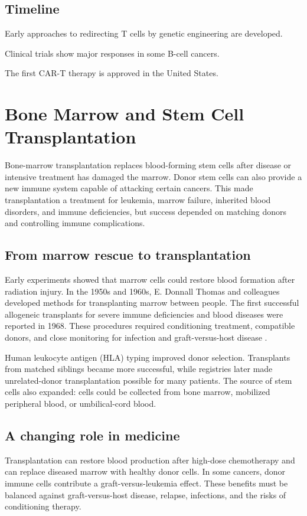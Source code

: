 \documentclass[12pt,oneside]{book}
\begin{document}
\section*{Timeline}
\begin{description}[leftmargin=2.3cm,style=nextline]
  \item[1980s--1990s] Early approaches to redirecting T cells by genetic engineering are developed.
  \item[2010s] Clinical trials show major responses in some B-cell cancers.
  \item[2017] The first CAR-T therapy is approved in the United States.
\end{description}
\chapter[Bone Marrow and Stem Cell Transplantation]{Bone Marrow and Stem Cell Transplantation}

Bone-marrow transplantation replaces blood-forming stem cells after disease or
intensive treatment has damaged the marrow. Donor stem cells can also provide
a new immune system capable of attacking certain cancers. This made
transplantation a treatment for leukemia, marrow failure, inherited blood
disorders, and immune deficiencies, but success depended on matching donors
and controlling immune complications.

\section{From marrow rescue to transplantation}
Early experiments showed that marrow cells could restore blood formation after radiation injury. In the 1950s and 1960s, E. Donnall Thomas and colleagues developed methods for transplanting marrow between people. The first successful allogeneic transplants for severe immune deficiencies and blood diseases were reported in 1968. These procedures required conditioning treatment, compatible donors, and close monitoring for infection and graft-versus-host disease \cite{transplantHistory}.

Human leukocyte antigen (HLA) typing improved donor selection. Transplants
from matched siblings became more successful, while registries later made
unrelated-donor transplantation possible for many patients. The source of stem
cells also expanded: cells could be collected from bone marrow, mobilized
peripheral blood, or umbilical-cord blood.

\section{A changing role in medicine}
Transplantation can restore blood production after high-dose chemotherapy and can replace diseased marrow with healthy donor cells. In some cancers, donor immune cells contribute a graft-versus-leukemia effect. These benefits must be balanced against graft-versus-host disease, relapse, infections, and the risks of conditioning therapy.
\end{document}
